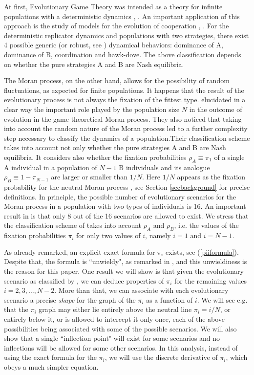 \documentclass[12pt]{article}
\begin{document}
At first, Evolutionary Game Theory was intended as a theory for infinite populations with a deterministic dynamics \cite{taylorjonker}, \cite{hofbauersigmund}. An important application of this approach is the study of models for the evolution of cooperation \cite{nowaksigmundnature}, \cite{nunezneves}. For the deterministic replicator dynamics and populations with two strategies, there exist 4 possible generic (or robust, see \cite{zeeman}) dynamical behaviors: dominance of A, dominance of B, coordination and hawk-dove. The above classification depends on whether the pure strategies A and B are Nash equilibria.

The Moran process, on the other hand, allows for the possibility of random fluctuations, as expected for finite populations. It happens that the result of the evolutionary process is not always the fixation of the fittest type. \cite{taylor} elucidated in a clear way the important role played by the population size $N$ in the outcome of evolution in the game theoretical Moran process. They also noticed that taking into account the random nature of the Moran process led to a further complexity step necessary to classify the dynamics of a population.Their classification scheme takes into account not only whether the pure strategies A and B are Nash equilibria. It considers also whether the fixation probabilities $\rho_A \equiv \pi_1$ of a single A individual in a population of $N-1$ B individuals and its analogue $\rho_B\equiv 1-\pi_{N-1}$ are larger or smaller than $1/N$. Here $1/N$ appears as the fixation probability for the neutral Moran process \cite{nowakbook}, see Section \ref{secbackground} for precise definitions. In principle, the possible number of evolutionary scenarios for the Moran process in a population with two types of individuals is 16. An important result in \cite{taylor} is that only 8 out of the 16 scenarios are allowed to exist. We stress that the classification scheme of \cite{taylor} takes into account $\rho_A$ and $\rho_B$, i.e. the values of the fixation probabilities $\pi_i$ for only two values of $i$, namely $i=1$ and $i=N-1$.

As already remarked, an explicit exact formula for $\pi_i$ exists, see (\ref{piiformula}). Despite that, the formula is ``unwieldy", as remarked in \cite{ewens}, and this unwieldiness is the reason for this paper. One result we will show is that given the evolutionary scenario as classified by \cite{taylor}, we can deduce properties of $\pi_i$ for the remaining values $i=2, 3, \dots, N-2$. More than that, we can associate with each evolutionary scenario a precise \textit{shape} for the graph of the $\pi_i$ as a function of $i$. We will see e.g. that the $\pi_i$ graph may either lie entirely above the neutral line $\pi_i=i/N$, or entirely below it, or is allowed to intercept it only once, each of the above possibilities being associated with some of the possible scenarios. We will also show that a single ``inflection point" will exist for some scenarios and no inflections will be allowed for some other scenarios. In this analysis, instead of using the exact formula for the $\pi_i$, we will use the discrete derivative of $\pi_i$, which obeys a much simpler equation.
\end{document}
